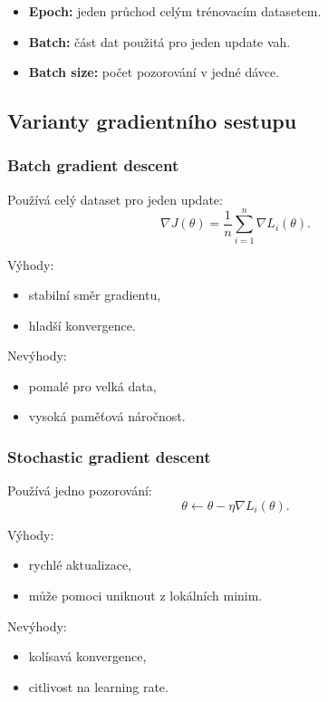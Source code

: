 \begin{itemize}
    \item \textbf{Epoch:}
    jeden průchod celým trénovacím datasetem.
    
    \item \textbf{Batch:}
    část dat použitá pro jeden update vah.
    
    \item \textbf{Batch size:}
    počet pozorování v jedné dávce.
\end{itemize}

\subsection{Varianty gradientního sestupu}

\subsubsection{Batch gradient descent}

Používá celý dataset pro jeden update:
\[
\nabla J(\theta)
=
\frac{1}{n}
\sum_{i=1}^n
\nabla L_i(\theta).
\]

Výhody:
\begin{itemize}
    \item stabilní směr gradientu,
    \item hladší konvergence.
\end{itemize}

Nevýhody:
\begin{itemize}
    \item pomalé pro velká data,
    \item vysoká paměťová náročnost.
\end{itemize}

\subsubsection{Stochastic gradient descent}

Používá jedno pozorování:
\[
\theta
\leftarrow
\theta
-
\eta
\nabla L_i(\theta).
\]

Výhody:
\begin{itemize}
    \item rychlé aktualizace,
    \item může pomoci uniknout z lokálních minim.
\end{itemize}

Nevýhody:
\begin{itemize}
    \item kolísavá konvergence,
    \item citlivost na learning rate.
\end{itemize}

